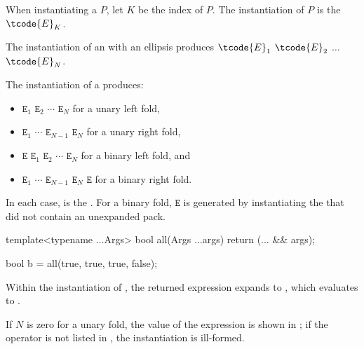 \pnum
When instantiating a  $P$,
let $K$ be the index of $P$.
The instantiation of $P$ is the  $\tcode{E}_K$.

\pnum
The instantiation of an  with an ellipsis
produces $\tcode{E}_1$ $\tcode{E}_2$ $\dotsc$ $\tcode{E}_N$.

\pnum
The instantiation of a  produces:
\begin{itemize}
\item
\tcode{(}\space
\tcode{((}$\mathtt{E}_1$
            $\mathtt{E}_2$\tcode{)}
            $\cdots$\tcode{)}
            $\mathtt{E}_N$
\space\tcode{)}
for a unary left fold,
\item
\tcode{(}\space
         $\mathtt{E}_1$     
\tcode{(}$\cdots$           
\tcode{(}$\mathtt{E}_{N-1}$ 
         $\mathtt{E}_N$\tcode{))}
\space\tcode{)}
for a unary right fold,
\item
\tcode{(}\space
\tcode{(((}$\mathtt{E}$
             $\mathtt{E}_1$\tcode{)}
             $\mathtt{E}_2$\tcode{)}
             $\cdots$\tcode{)}
             $\mathtt{E}_N$
\space\tcode{)}
for a binary left fold, and
\item
\tcode{(}\space
         $\mathtt{E}_1$     
\tcode{(}$\cdots$           
\tcode{(}$\mathtt{E}_{N-1}$ 
\tcode{(}$\mathtt{E}_{N}$   
         $\mathtt{E}$\tcode{)))}
\space\tcode{)}
for a binary right fold.
\end{itemize}

In each case,
 is the .
For a binary fold,
$\mathtt{E}$ is generated
by instantiating the 
that did not contain an unexpanded pack.
\begin{example}
\begin{codeblock}
template<typename ...Args>
  bool all(Args ...args) { return (... && args); }

bool b = all(true, true, true, false);
\end{codeblock}
Within the instantiation of ,
the returned expression expands to
,
which evaluates to .
\end{example}
If $N$ is zero for a unary fold,
the value of the expression is shown in ;
if the operator is not listed in ,
the instantiation is ill-formed.

